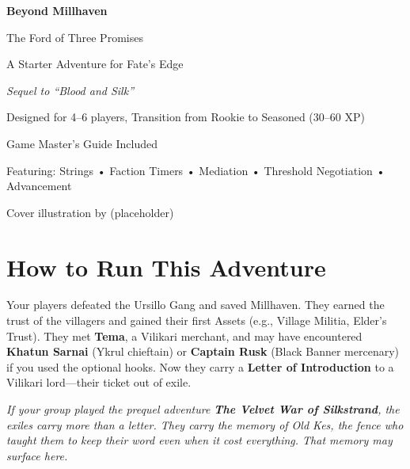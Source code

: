 \documentclass[10pt,twoside]{book}
\begin{document}
\begin{titlepage}
\centering
\vspace*{2cm}
{\Huge\bfseries Beyond Millhaven\par}
\vspace{1cm}
{\Large The Ford of Three Promises\par}
\vspace{2cm}
{\large A Starter Adventure for Fate's Edge\par}
\vspace{1cm}
{\normalsize \textit{Sequel to ``Blood and Silk''}\par}
\vspace{2cm}
{\normalsize Designed for 4--6 players, Transition from Rookie to Seasoned (30--60 XP)\par}
\vspace{1cm}
{\normalsize Game Master's Guide Included\par}
\vfill
{\normalsize Featuring: Strings • Faction Timers • Mediation • Threshold Negotiation • Advancement\par}
\vspace{0.5cm}
{\normalsize Cover illustration by (placeholder)\par}
\end{titlepage}

\chapter*{How to Run This Adventure}

\begin{recapbox}
Your players defeated the Ursillo Gang and saved Millhaven. They earned the trust of the villagers and gained their first Assets (e.g., Village Militia, Elder's Trust). They met \textbf{Tema}, a Vilikari merchant, and may have encountered \textbf{Khatun Sarnai} (Ykrul chieftain) or \textbf{Captain Rusk} (Black Banner mercenary) if you used the optional hooks. Now they carry a \textbf{Letter of Introduction} to a Vilikari lord---their ticket out of exile.

\vspace{0.5em}
\noindent \textit{If your group played the prequel adventure \textbf{The Velvet War of Silkstrand}, the exiles carry more than a letter. They carry the memory of Old Kes, the fence who taught them to keep their word even when it cost everything. That memory may surface here.}
\end{recapbox}
\end{document}
